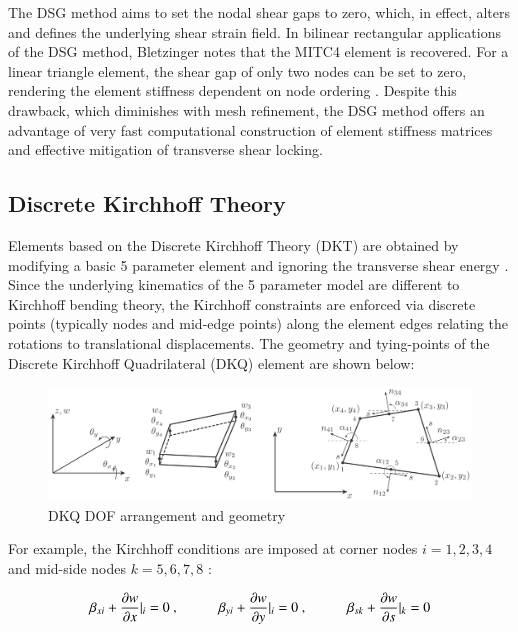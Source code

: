 The DSG method aims to set the nodal shear gaps to zero, which, in effect, alters and defines the underlying shear strain field. In bilinear rectangular applications of the DSG method, Bletzinger \cite{Ble00} notes that the MITC4 element is recovered. For a linear triangle element, the shear gap of only two nodes can be set to zero, rendering the element stiffness dependent on node ordering \cite{Ble00}. Despite this drawback, which diminishes with mesh refinement, the DSG method offers an advantage of very fast computational construction of element stiffness matrices and effective mitigation of transverse shear locking.

\subsection{Discrete Kirchhoff Theory}

Elements based on the Discrete Kirchhoff Theory (DKT) are obtained by modifying a basic 5 parameter element and ignoring the transverse shear energy \cite{Batoz1980}. Since the underlying kinematics of the 5 parameter model are different to Kirchhoff bending theory, the Kirchhoff constraints are enforced via discrete points (typically nodes and mid-edge points) along the element edges relating the rotations to translational displacements. The geometry and tying-points of the Discrete Kirchhoff Quadrilateral (DKQ) element are shown below:

\begin{figure}[H]
	\centering
	\def\svgwidth{\columnwidth}
	\includegraphics[width=15cm]{images/8nodeseren.png}
	\caption{DKQ DOF arrangement and geometry \cite{Bar12}}
	\label{DKQlayout}
\end{figure}

For example, the Kirchhoff conditions are imposed at corner nodes $i = 1, 2, 3, 4$ and mid-side nodes $k = 5, 6, 7, 8$ \cite{Bar12}:

\begin{equation} 
\beta_{xi} + \frac{\partial w}{\partial x} \rvert_i = 0\ ,
\hspace{10mm}
\beta_{yi} + \frac{\partial w}{\partial y} \rvert_i = 0\ ,
\hspace{10mm}
\beta_{sk} + \frac{\partial w}{\partial s} \rvert_k = 0
\label{eqsdkt}
\end{equation}

